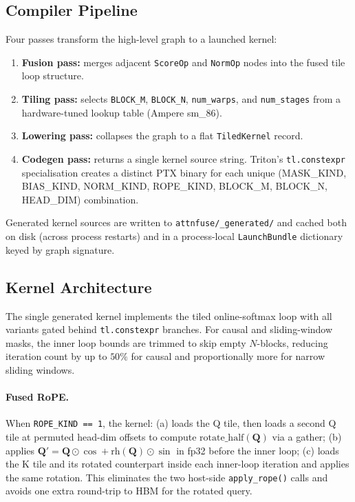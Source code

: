 \documentclass[10pt,twocolumn]{article}
\begin{document}
\subsection{Compiler Pipeline}

Four passes transform the high-level graph to a launched kernel:

\begin{enumerate}[leftmargin=1.5em,itemsep=1pt]
  \item \textbf{Fusion pass:} merges adjacent \texttt{ScoreOp} and
        \texttt{NormOp} nodes into the fused tile loop structure.
  \item \textbf{Tiling pass:} selects \texttt{BLOCK\_M},
        \texttt{BLOCK\_N}, \texttt{num\_warps}, and \texttt{num\_stages}
        from a hardware-tuned lookup table (Ampere sm\_86).
  \item \textbf{Lowering pass:} collapses the graph to a flat
        \texttt{TiledKernel} record.
  \item \textbf{Codegen pass:} returns a single kernel source string.
        Triton's \texttt{tl.constexpr} specialisation creates a distinct
        PTX binary for each unique (MASK\_KIND, BIAS\_KIND, NORM\_KIND,
        ROPE\_KIND, BLOCK\_M, BLOCK\_N, HEAD\_DIM) combination.
\end{enumerate}

Generated kernel sources are written to \texttt{attnfuse/\_generated/}
and cached both on disk (across process restarts) and in a process-local
\texttt{LaunchBundle} dictionary keyed by graph signature.

\subsection{Kernel Architecture}

The single generated kernel implements the tiled online-softmax loop with
all variants gated behind \texttt{tl.constexpr} branches.  For causal and
sliding-window masks, the inner loop bounds are trimmed to skip empty
$N$-blocks, reducing iteration count by up to $50\%$ for causal and
proportionally more for narrow sliding windows.

\paragraph{Fused RoPE.}
When \texttt{ROPE\_KIND\,==\,1}, the kernel:
(a) loads the Q tile, then loads a second Q tile at permuted head-dim
    offsets to compute $\text{rotate\_half}(\mathbf{Q})$ via a gather;
(b) applies $\mathbf{Q}' = \mathbf{Q} \odot \cos + \text{rh}(\mathbf{Q}) \odot \sin$
    in fp32 before the inner loop;
(c) loads the K tile and its rotated counterpart inside each inner-loop
    iteration and applies the same rotation.
This eliminates the two host-side \texttt{apply\_rope()} calls and avoids
one extra round-trip to HBM for the rotated query.
\end{document}
